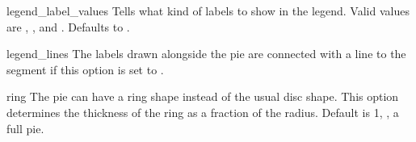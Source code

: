 \begin{AttrDecl}{legend\_label\_values}
Tells \thisclass what kind of labels to show in the legend. Valid values
are , ,  and
. Defaults to .
\end{AttrDecl}

\begin{AttrDecl}{legend\_lines}
The labels drawn alongside the pie are connected with a line to the
segment if this option is set to .
\end{AttrDecl}

\begin{AttrDecl}{ring}
The pie can have a ring shape instead of the usual disc shape. This
option determines the thickness of the ring as a fraction of the radius.
Default is 1, \ie, a full pie.
\end{AttrDecl}
